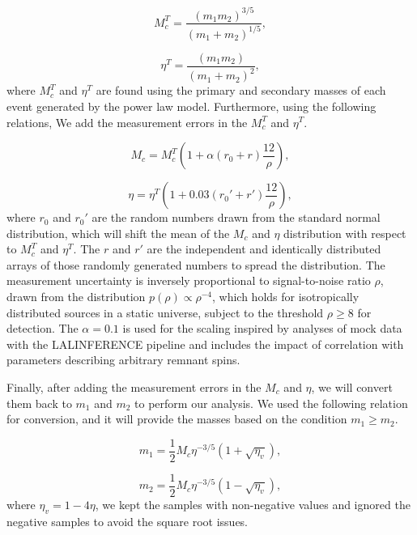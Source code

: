 \documentclass[twocolumn,prd,nofootinbib]{revtex4}
\begin{document}
\begin{equation}
    M_c^T = \frac{(m_1 m_2)^{3/5}}{(m_1+m_2)^{1/5}},
\end{equation}

\begin{equation}
    \eta^T = \frac{(m_1 m_2)}{(m_1+m_2)^2},
\end{equation}
%
where $M_c^T$ and $\eta^T$ are found using the primary and secondary masses of each event generated by the power law model.
Furthermore, using the following relations, We add the measurement errors in the $M_c^T$ and $\eta^T$.

\begin{equation}
    M_c = M_c^T\left( 1+\alpha (r_0+r ) \frac{12}{\rho}\right),
\end{equation}

\begin{equation}
\eta = \eta^T\left( 1+0.03 (r_0'+r') \frac{12}{\rho}\right),   
\end{equation}
where $r_0$ and $r_0'$ are the random numbers drawn from the standard normal distribution, which will shift the mean of the $M_c$ and $\eta$ distribution with respect to $M_c^T$ and $\eta^T$. The $r$ and $r'$ are the independent and identically distributed arrays of those randomly generated numbers to spread the distribution. The measurement uncertainty is inversely proportional to signal-to-noise ratio $\rho$, drawn from the distribution $p(\rho) \propto \rho^{-4}$, which holds for isotropically distributed sources in a static universe, subject to the threshold $\rho\geq 8$ for detection. The $\alpha =0.1$ is used for the scaling inspired by analyses of mock data with the LALINFERENCE pipeline \cite{alpha_error_2015} and includes the impact of correlation with parameters describing arbitrary remnant spins.

Finally, after adding the measurement errors in the $M_c$ and $\eta$, we will convert them back to $m_1$ and $m_2$ to perform our analysis. We used the following relation for conversion, and it will provide the masses based on the condition $m_1\geq m_2$.

\begin{equation}
    m_1 = \frac{1}{2} M_c \eta^{-3/5} (1+\sqrt{\eta_v}),
\end{equation}

\begin{equation}
    m_2 = \frac{1}{2} M_c \eta^{-3/5} (1-\sqrt{\eta_v}), 
\end{equation}
where $\eta_v = 1-4\eta$, we kept the samples with non-negative values and ignored the negative samples to avoid the square root issues. 
\end{document}
